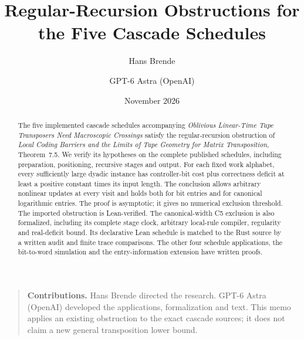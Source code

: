 \documentclass[11pt]{article}
\title{Regular-Recursion Obstructions for the Five Cascade Schedules}
\author{Hans Brende \and GPT-6 Astra (OpenAI)}
\date{November 2026}
\numberwithin{equation}{section}
\begin{document}
\maketitle
\begin{abstract}
The five implemented cascade schedules accompanying \emph{Oblivious
Linear-Time Tape Transposers Need Macroscopic Crossings} satisfy the
regular-recursion obstruction of \emph{Local Coding Barriers and the Limits
of Tape Geometry for Matrix Transposition}, Theorem~7.5. We verify its
hypotheses on the complete published schedules, including preparation,
positioning, recursive stages and output. For each fixed work alphabet,
every sufficiently large dyadic instance has controller-bit cost plus
correctness deficit at least a positive constant times its input length.
The conclusion allows arbitrary nonlinear updates at every visit and holds
both for bit entries and for canonical logarithmic entries. The proof is
asymptotic; it gives no numerical exclusion threshold. The imported
obstruction is Lean-verified. The canonical-width C5 exclusion is also
formalized, including its complete stage clock, arbitrary local-rule
compiler, regularity and real-deficit bound. Its declarative Lean schedule
is matched to the Rust source by a written audit and finite trace
comparisons. The other four schedule applications, the bit-to-word
simulation and the entry-information extension have written proofs.
\end{abstract}
\begin{quote}\small
\textbf{Contributions.} Hans Brende directed the research. GPT-6 Astra
(OpenAI) developed the applications, formalization and text. This memo
applies an existing obstruction to the exact cascade sources; it does not
claim a new general transposition lower bound.
\end{quote}
\setcounter{tocdepth}{1}
\begingroup\small\tableofcontents\endgroup
\clearpage





\appendix

\begingroup\small\raggedright


\endgroup
\end{document}

